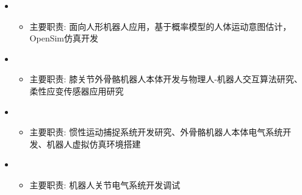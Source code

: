   \begin{itemize}[leftmargin=*]
    \item
      {\small
      \begin{itemize}
        \item{主要职责: 面向人形机器人应用，基于概率模型的人体运动意图估计，OpenSim仿真开发}
      \end{itemize}}
    \item
      {\small
      \begin{itemize}
        \item{主要职责: 膝关节外骨骼机器人本体开发与物理人-机器人交互算法研究、柔性应变传感器应用研究}
      \end{itemize}}
    \item
      {\small
      \begin{itemize}
        \item{主要职责: 惯性运动捕捉系统开发研究、外骨骼机器人本体电气系统开发、机器人虚拟仿真环境搭建}
      \end{itemize}}
    \item
      {\small
      \begin{itemize}
        \item{主要职责: 机器人关节电气系统开发调试}
      \end{itemize}}
  \end{itemize}